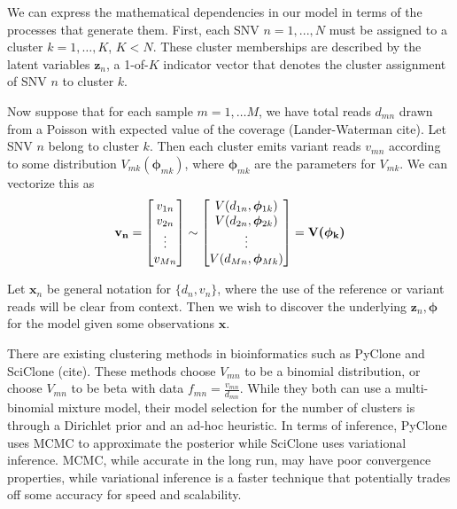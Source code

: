 \documentclass[11pt]{article}
\newcommand{\bx}{\ensuremath{\mathbf{x}}}
\newcommand{\bz}{\ensuremath{\mathbf{z}}}
\newcommand{\bphi}{\ensuremath{\bm{\phi}}}
\begin{document}

We can express the mathematical dependencies in our model in terms of the processes that generate them. First, each SNV $n = 1, ..., N$ must be assigned to a cluster $k=1,\ldots,K$, $K < N$. These cluster memberships are described by the latent variables $\bz_n$, a 1-of-$K$ indicator vector that denotes the cluster assignment of SNV $n$ to cluster $k$. 

Now suppose that for each sample $m=1, \ldots M$, we have total reads $d_{mn}$ drawn from a Poisson with expected value of the coverage (Lander-Waterman cite). Let SNV $n$ belong to cluster $k$. Then each cluster emits variant reads $v_{mn}$ according to some distribution $V_{mk}(\bphi_{mk})$, where $\bphi_{mk}$ are the parameters for $V_{mk}$. We can vectorize this as 
\begin{align}
				\bf{v}_{n} = 
				\begin{bmatrix}
				 	v_{1n} \\ v_{2n} \\ \vdots \\ v_{Mn}
				\end{bmatrix}
				\sim
				\begin{bmatrix}
					V(d_{1n}, \bphi_{1k}) \\ V(d_{2n}, \bphi_{2k}) \\ \vdots \\ V(d_{Mn}, \bphi_{Mk})
				\end{bmatrix}
				= \bm{V(\bphi_k)}
\end{align}


Let $\bx_n$ be general notation for $\{d_{n}, v_{n}\}$, where the use of the reference or variant reads will be clear from context. Then we wish to discover the underlying $\bz_n, \bphi$ for the model given some observations $\bx$.


There are existing clustering methods in bioinformatics such as PyClone and SciClone (cite). These methods choose $V_{mn}$ to be a binomial distribution, or choose $V_{mn}$ to be beta with data $f_{mn} = \frac{v_{mn}}{d_{mn}}$. While they both can use a multi-binomial mixture model, their model selection for the number of clusters is through a Dirichlet prior and an ad-hoc heuristic. In terms of inference, PyClone uses MCMC to approximate the posterior while SciClone uses variational inference. MCMC, while accurate in the long run, may have poor convergence properties, while variational inference is a faster technique that potentially trades off some accuracy for speed and scalability.
\end{document}
